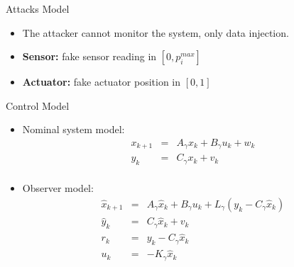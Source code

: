 \documentclass{beamer}
\def\itemizespace{\vspace{3mm}}
\begin{document}
\begin{frame}{Attacks Model}

	\begin{itemize}
		\item \alert<+>{The attacker cannot monitor the system, only data
			injection.}

		\itemizespace

		\item \alert<+>
		{
			\textbf{Sensor:} fake sensor reading in $[0,p_{i}^{max}]$ \\
		}

		\itemizespace

		\item \alert<+>
		{
			\textbf{Actuator:} fake actuator position in $[0,1]$ \\
		}
    \end{itemize}
\end{frame}

\begin{frame}{Control Model}
	\begin{itemize}
		\item \alert<+>
		{
			Nominal system model:
			\[
				\begin{array}{rcl}
					x_{k+1}	& =	& A_\gamma x_k + B_\gamma u_k + w_k \\
					y_k		& =	& C_\gamma x_k + v_k \\
				\end{array} 
			\]
		}

		\itemizespace

		\item \alert<+>
		{
			Observer model:
			\[
				\begin{array}{rcl}
					\hat{x}_{k+1}	& =	& A_\gamma \hat{x}_k + B_\gamma u_k + L_\gamma (y_k - C_\gamma \hat{x}_k ) \\
					\hat{y}_k		& =	& C_\gamma \hat{x}_k + v_k	\\
					r_k				& = & y_k - C_\gamma \hat{x}_k	\\
					u_k				& = & -K_\gamma \hat{x}_k		\\
				\end{array} 
			\]
		}
	\end{itemize}
\end{frame}
\end{document}
